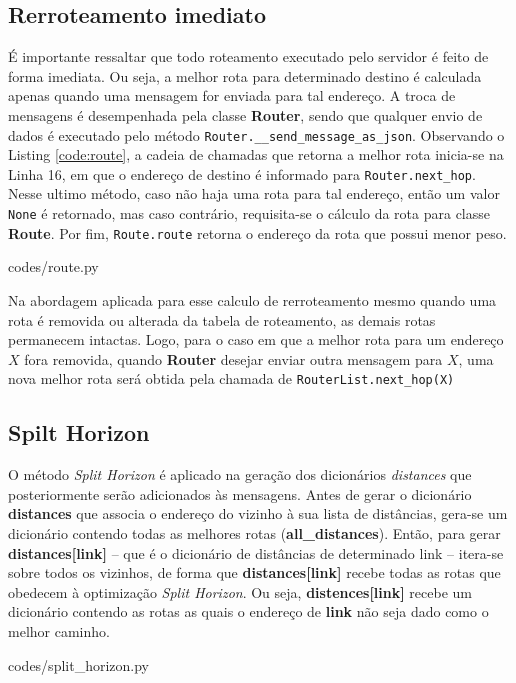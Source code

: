 \subsection{Rerroteamento imediato}
É importante ressaltar que todo roteamento executado pelo servidor é feito de
forma imediata.
Ou seja, a melhor rota para determinado destino é calculada apenas quando uma
mensagem for enviada para tal endereço.
A troca de mensagens é desempenhada pela classe \textbf{Router}, sendo que
qualquer envio de dados é executado pelo método \texttt{Router.\_\_send\_message\_as\_json}. 
Observando o Listing \ref{code:route}, a cadeia de chamadas que retorna a melhor
rota inicia-se na Linha 16, em que o endereço de destino é informado para
\texttt{Router.next\_hop}.
Nesse ultimo método, caso não haja uma rota para tal endereço, então um valor
\texttt{None} é retornado, mas caso contrário, requisita-se o cálculo da rota
para classe \textbf{Route}.
Por fim, \texttt{Route.route} retorna o endereço da rota que possui menor peso.


{codes/route.py}

Na abordagem aplicada para esse calculo de rerroteamento mesmo quando uma rota
é removida ou alterada da tabela de roteamento, as demais rotas permanecem
intactas.
Logo, para o caso em que a melhor rota para um endereço $X$ fora removida,
quando \textbf{Router} desejar enviar outra mensagem para $X$, uma nova melhor
rota será obtida pela chamada de \texttt{RouterList.next\_hop(X)}

\subsection{Spilt Horizon}
O método \textit{Split Horizon} é aplicado na geração dos dicionários
\textit{distances} que posteriormente serão adicionados às mensagens.
Antes de gerar o dicionário \textbf{distances} que associa o endereço do
vizinho à sua lista de distâncias, gera-se um dicionário contendo todas as
melhores rotas (\textbf{all\_distances}).
Então, para gerar \textbf{distances[link]} -- que é o dicionário de distâncias
de determinado link -- itera-se sobre todos os vizinhos, de forma que
\textbf{distances[link]} recebe todas as rotas que obedecem à optimização
\textit{Split Horizon}.
Ou seja, \textbf{distences[link]} recebe um dicionário contendo as rotas as
quais o endereço de \textbf{link} não seja dado como o melhor caminho.


{codes/split_horizon.py}
